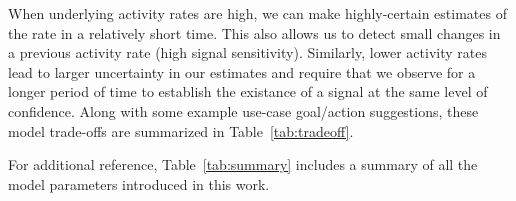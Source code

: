 \documentclass{article}
\begin{document}
When 
\reversemarginpar\marginpar{\raggedleft
%
    \begin{tikzpicture}[scale=0.26]]
\draw [red, very thick, rotate around={0: (0, 0)}] (-0.7, -0.7) rectangle(3.7, 3.298076211353316);
%
\draw [very thick, <->] (0.25000000000000006, 0.4330127018922193) -- (1.25, 2.165063509461097) ;
\draw [very thick, <->] (1.75, 2.165063509461097) -- (2.75, 0.4330127018922193) ;
\draw [very thick, <->] (2.5, 0) -- (0.5, 0) ;
%
\draw [orange, ultra thick] (0,0) circle [radius= 0.5 ];
\draw [yellow, ultra thick] ( 1.5 , 2.59807621135 ) circle [radius= 0.5 ];
\draw [green,  ultra thick] ( 3.0 , 0 ) circle [radius= 0.5 ];
    \end{tikzpicture}
%
%
}
underlying activity rates are high, we can make highly-certain estimates of the rate in a relatively 
short time. This also allows us to detect small changes in a previous activity rate (high signal 
sensitivity). Similarly, lower activity rates lead to larger uncertainty in our estimates and require that 
we observe for a longer period of time to establish the existance of a signal at the same 
level of confidence. Along with some example use-case goal/action suggestions, these model 
trade-offs are summarized in Table~\ref{tab:tradeoff}.

For additional reference, Table~\ref{tab:summary} includes a summary of all the model parameters 
introduced in this work.
\end{document}

